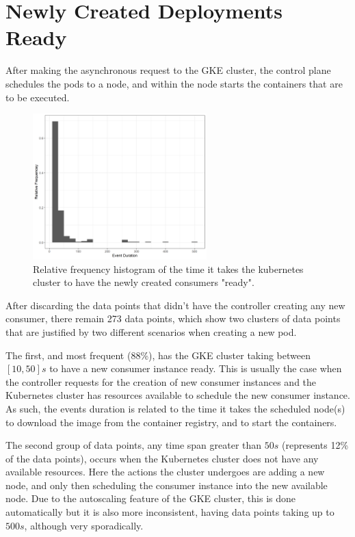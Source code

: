 \section{Newly Created Deployments Ready}

After making the asynchronous request to the GKE cluster, the control plane schedules the pods to a node, and within the node starts the containers that are to be executed.

\begin{figure}[H]
    \centering
    \includegraphics[width=0.6\textwidth]{images/integration/delta3.png}
\caption{Relative frequency histogram of the time it takes the kubernetes cluster to have the newly created consumers "ready".}
\label{fig:controller_result_kubernetes}
\end{figure}

After discarding the data points that didn't have the controller creating any new consumer, there remain 273 data points, which show two clusters of data points that are justified by two different scenarios when creating a new pod. 

The first, and most frequent (88\%), has the GKE cluster taking between $[10, 50]s$ to have a new consumer instance ready. This is usually the case when the controller requests for the creation of new consumer instances and the Kubernetes cluster has resources available to schedule the new consumer instance. As such, the events duration is related to the time it takes the scheduled node(s) to download the image from the container registry, and to start the containers.

The second group of data points, any time span greater than $50s$ (represents 12\% of the data points), occurs when the Kubernetes cluster does not have any available resources. Here the actions the cluster undergoes are adding a new node, and only then scheduling the consumer instance into the new available node. Due to the autoscaling feature of the GKE cluster, this is done automatically but it is also more inconsistent, having data points taking up to $500s$, although very sporadically.

